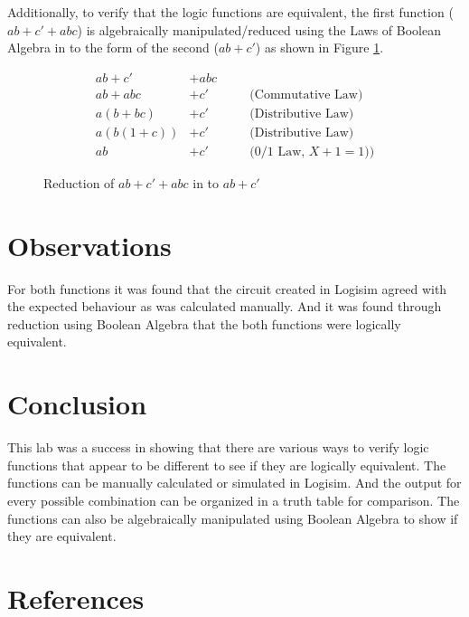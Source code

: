 \documentclass[12pt]{article}
\begin{document}
Additionally, to verify that the logic functions are equivalent,
the first function ($a b + c' + a b c$) is algebraically manipulated/reduced
using the Laws of Boolean Algebra \cite[Pg. 55]{roth2009fundamentals}
in to the form of the second ($a b + c'$) as shown in Figure \ref{fig:red}.

\begin{figure}
\begin{align*}
a b + c' &+ abc 	&& \\
a b + abc &+ c' 	&& \quad \mbox{(Commutative Law)} \\
a (b + bc) &+ c' 	&& \quad \mbox{(Distributive Law)} \\
a (b (1 + c)) &+ c' && \quad \mbox{(Distributive Law)} \\
a b &+ c' 			&& \quad \mbox{($0/1$ Law, $X + 1 = 1$))}
\end{align*}

\caption{Reduction of $ab + c' + abc$ in to $ab + c'$}
\label{fig:red}
\end{figure}

\section{Observations}

For both functions it was found that the circuit created in Logisim
agreed with the expected behaviour as was calculated manually.
And it was found through reduction using Boolean Algebra that the
both functions were logically equivalent.


\section{Conclusion}

This lab was a success in showing that there are various ways to
verify logic functions that appear to be different to see if they
are logically equivalent.
The functions can be manually calculated or simulated in Logisim.
And the output for every possible combination can be organized
in a truth table for comparison.
The functions can also be algebraically manipulated using Boolean Algebra
to show if they are equivalent.


\renewcommand*{\refname}{\vspace{-8mm}}
\section{References}
%
%



\end{document}
